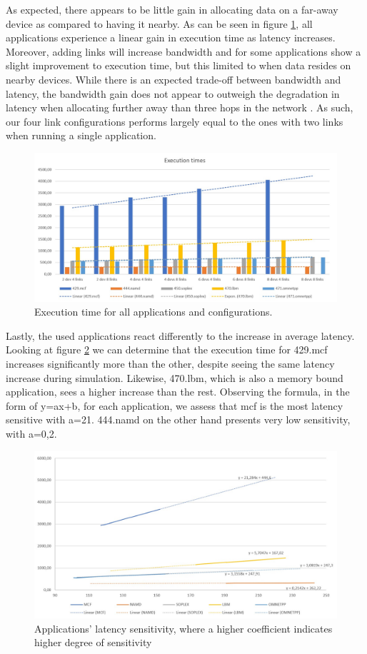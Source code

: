 As expected, there appears to be little gain in allocating data on a far-away device as compared to having it nearby. As can be seen in figure \ref{All-apps-latency}, all applications experience a linear gain in execution time as latency increases. Moreover, adding links will increase bandwidth and for some applications show a slight improvement to execution time, but this limited to when data resides on nearby devices. While there is an expected trade-off between bandwidth and latency, the bandwidth gain does not appear to outweigh the degradation in latency when allocating further away than three hops in the network \cite{10.1145/3167132.3167249}. As such, our four link configurations performs largely equal to the ones with two links when running a single application.
\bigskip

\begin{figure}[!ht]
    \centering
    \includegraphics[width=1.0\linewidth]{figure/all-apps-exectime.jpg}
    \caption{Execution time for all applications and configurations.}
    \label{All-apps-latency}
\end{figure}

Lastly, the used applications react differently to the increase in average latency. Looking at figure \ref{All-apps-latency-trends} we can determine that the execution time for 429.mcf increases significantly more than the other, despite seeing the same latency increase during simulation. Likewise, 470.lbm, which is also a memory bound application, sees a higher increase than the rest. Observing the formula, in the form of {y=ax+b}, for each application, we assess that mcf is the most latency sensitive with {a=21}. 444.namd on the other hand presents very low sensitivity, with {a=0,2}.

\begin{figure}[!ht]
    \centering
    \includegraphics[width=1.0\linewidth]{figure/all-apps-latencies-trends.jpg}
    \caption{Applications' latency sensitivity, where a higher coefficient indicates higher degree of sensitivity}
    \label{All-apps-latency-trends}
\end{figure}